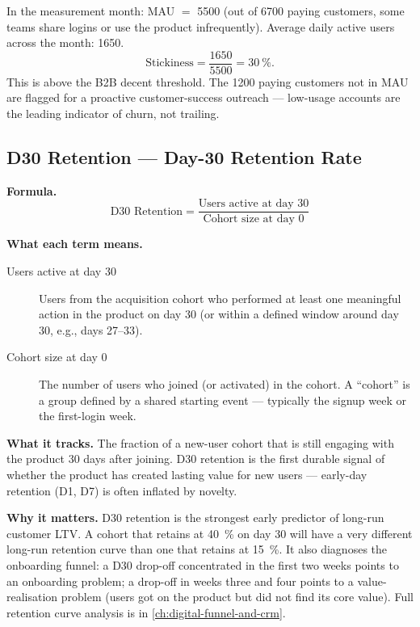 \begin{example}
In the measurement month: MAU $=$ \num{5500} (out of \num{6700} paying customers, some
teams share logins or use the product infrequently). Average daily active users across
the month: \num{1650}.
\[
  \text{Stickiness} = \frac{1650}{5500} = \qty{30}{\percent}.
\]
This is above the B2B decent threshold. The \num{1200} paying customers not in MAU are
flagged for a proactive customer-success outreach --- low-usage accounts are the leading
indicator of churn, not trailing.
\end{example}


\subsection{D30 Retention --- Day-30 Retention Rate}

\textbf{Formula.}
\[
  \text{D30 Retention} = \frac{\text{Users active at day 30}}{\text{Cohort size at day 0}}
\]

\textbf{What each term means.}
\begin{description}
  \item[Users active at day 30] Users from the acquisition cohort who performed at least one
    meaningful action in the product on day 30 (or within a defined window around day 30,
    e.g., days 27--33).
  \item[Cohort size at day 0] The number of users who joined (or activated) in the cohort.
    A ``cohort'' is a group defined by a shared starting event --- typically the signup week
    or the first-login week.
\end{description}

\textbf{What it tracks.} The fraction of a new-user cohort that is still engaging with the
product 30 days after joining. D30 retention is the first durable signal of whether the
product has created lasting value for new users --- early-day retention (D1, D7) is often
inflated by novelty.

\textbf{Why it matters.} D30 retention is the strongest early predictor of long-run customer
LTV. A cohort that retains at \qty{40}{\percent} on day 30 will have a very different
long-run retention curve than one that retains at \qty{15}{\percent}. It also diagnoses
the onboarding funnel: a D30 drop-off concentrated in the first two weeks points to an
onboarding problem; a drop-off in weeks three and four points to a value-realisation problem
(users got on the product but did not find its core value). Full retention curve analysis
is in \cref{ch:digital-funnel-and-crm}.

